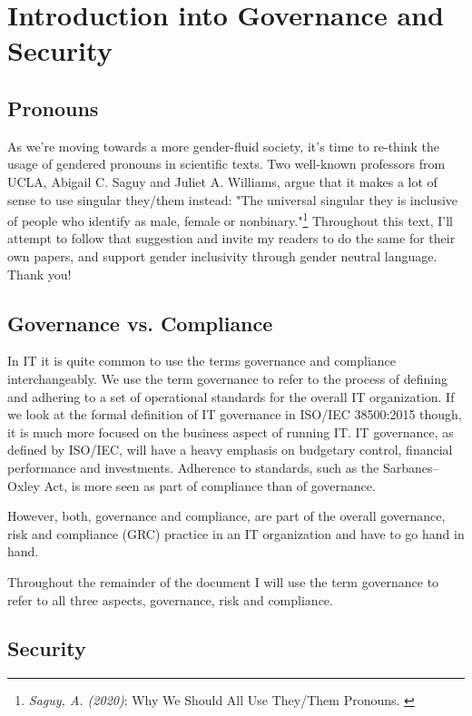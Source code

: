 %
%

\pagebreak
\section{Introduction into Governance and Security}

\onehalfspacing

\subsection{Pronouns}

As we're moving towards a more gender-fluid society, it's time to re-think the usage of gendered pronouns in scientific texts. Two well-known professors from UCLA, Abigail C. Saguy and Juliet A. Williams, argue that it makes a lot of sense to use singular they/them instead: "The universal singular they is inclusive of people who identify as male, female or nonbinary."\footnote{\textit{Saguy, A. (2020)}: Why We Should All Use They/Them Pronouns. \cite{pronouns}} Throughout this text, I'll attempt to follow that suggestion and invite my readers to do the same for their own papers, and support gender inclusivity through gender neutral language. Thank you!

\subsection{Governance vs. Compliance}

In IT it is quite common to use the terms governance and compliance interchangeably. We use the term governance to refer to the process of defining and adhering to a set of operational standards for the overall IT organization. If we look at the formal definition of IT governance in ISO/IEC 38500:2015 though, it is much more focused on the business aspect of running IT. IT governance, as defined by ISO/IEC, will have a heavy emphasis on budgetary control, financial performance and investments. Adherence to standards, such as the Sarbanes–Oxley Act, is more seen as part of compliance than of governance.

However, both, governance and compliance, are part of the overall governance, risk and compliance (GRC) practice in an IT organization and have to go hand in hand.

Throughout the remainder of the document I will use the term governance to refer to all three aspects, governance, risk and compliance.

\subsection{Security}

